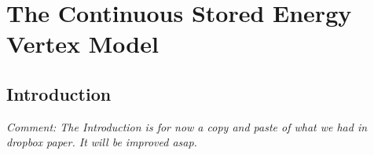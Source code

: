 \chapter{The Continuous Stored Energy Vertex Model}
\label{chap:storedenergy}

\section{Introduction}

\emph{Comment: The Introduction is for now a copy and paste
of what we had in dropbox paper. It will be improved asap.}


